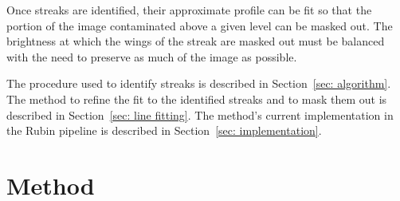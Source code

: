 \documentclass[DM,authoryear,toc]{lsstdoc}
\begin{document}
Once streaks are identified, their approximate profile can be fit so that the portion of the image contaminated above a given level can be masked out. The brightness at which the wings of the streak are masked out must be balanced with the need to preserve as much of the image as possible.

The procedure used to identify streaks is described in Section~\ref{sec: algorithm}. The method to refine the fit to the identified streaks and to mask them out is described in Section~\ref{sec: line fitting}. The method's current implementation in the Rubin pipeline is described in Section~\ref{sec: implementation}.

\section{Method}
\end{document}
